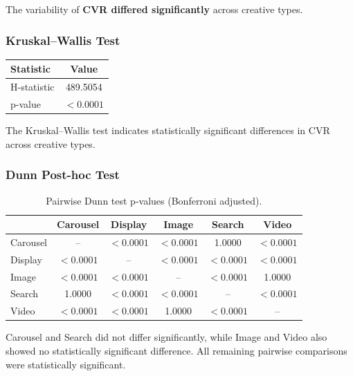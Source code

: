 The variability of \textbf{CVR differed significantly} across creative types.

\vspace{0.3cm}

\subsubsection{Kruskal--Wallis Test}

\begin{table}[H]
	\centering
	\begin{tabular}{lc}
		\toprule
		Statistic & Value \\
		\midrule
		H-statistic & 489.5054 \\
		p-value & $<0.0001$ \\
		\bottomrule
	\end{tabular}
\end{table}

The Kruskal--Wallis test indicates statistically significant differences in CVR across creative types.

\vspace{0.3cm}

\subsubsection{Dunn Post-hoc Test}

\begin{table}[H]
	\centering
	\caption{Pairwise Dunn test p-values (Bonferroni adjusted).}
	\begin{tabular}{lccccc}
		\toprule
		& Carousel & Display & Image & Search & Video \\
		\midrule
		Carousel & -- & $<0.0001$ & $<0.0001$ & 1.0000 & $<0.0001$ \\
		Display & $<0.0001$ & -- & $<0.0001$ & $<0.0001$ & $<0.0001$ \\
		Image & $<0.0001$ & $<0.0001$ & -- & $<0.0001$ & 1.0000 \\
		Search & 1.0000 & $<0.0001$ & $<0.0001$ & -- & $<0.0001$ \\
		Video & $<0.0001$ & $<0.0001$ & 1.0000 & $<0.0001$ & -- \\
		\bottomrule
	\end{tabular}
\end{table}

Carousel and Search did not differ significantly, while Image and Video also showed no statistically significant difference. All remaining pairwise comparisons were statistically significant.


